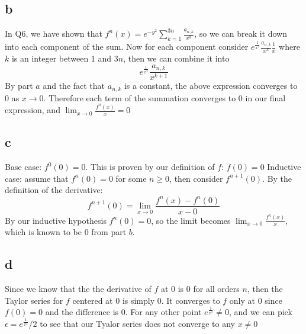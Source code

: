 \documentclass[12pt]{article}
\begin{document}
\subsection{b}
In Q6, we have shown that $f^{n}(x) = e^{-y^2}\sum_{k=1}^{3n}\frac{a_{n,k}}{x^k}$, so we can break it down into each component of the sum. Now for each component consider
$e^{\frac{1}{x^2}}\frac{a_{n,k}}{x^k}\frac{1}{x}$
where $k$ is an integer between $1$ and $3n$, then we can combine it into
$$e^{\frac{1}{x^2}}\frac{a_{n,k}}{x^{k+1}}$$
By part $a$ and the fact that $a_{n,k}$ is a constant, the above expression converges to $0$ as $x \to 0$. Therefore each term of the summation converges to $0$ in our final expression, and $\lim_{x \to 0}\frac{f^{n}(x)}{x}=0$

\subsection{c}
Base case: $f^0(0)=0$. This is proven by our definition of $f$: $f(0)=0$
\newline
Inductive case: assume that $f^n(0)=0$ for some $n \geq 0$, then consider $f^{n+1}(0)$. By the definition of the derivative:
$$f^{n+1}(0) = \lim_{x \to 0}\frac{f^{n}(x)-f^{n}(0)}{x-0}$$
By our inductive hypothesis $f^{n}(0) = 0$, so the limit becomes $\lim_{x \to 0}\frac{f^{n}(x)}{x}$, which is known to be $0$ from part $b$.

\subsection{d}
Since we know that the the derivative of $f$ at $0$ is $0$ for all orders $n$, then the Taylor series for $f$ centered at $0$ is simply $0$. It converges to $f$ only at $0$ since $f(0)=0$ and the difference is $0$.
\newline
For any other point $e^{\frac{1}{x^2}} \not = 0$, and we can pick $\epsilon = e^{\frac{1}{x^2}}/2$ to see that our Tyalor series does not converge to any $x \not = 0$
\end{document}

